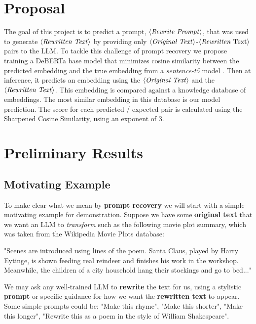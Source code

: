 \documentclass{article}
\theoremstyle{plain}
\theoremstyle{definition}
\theoremstyle{remark}
\begin{document}
\section{Proposal} %
The goal of this project is to predict a prompt, $\langle \text{\textit{Rewrite Prompt}} \rangle$, that was used to generate $\langle \text{\textit{Rewritten Text}} \rangle$ by providing only $\langle \text{\textit{Original Text}} \rangle$-$\langle \text{\textit{Rewritten} Text} \rangle$ pairs to the LLM. To tackle this challenge of prompt recovery we propose training a DeBERTa base model \cite{he2021deberta} that minimizes cosine similarity between the predicted embedding and the true embedding from a \textit{sentence-t5} model \cite{ni2021sentencet5}. Then at inference, it predicts an embedding using the $\langle \text{\textit{Original Text}} \rangle$ and the $\langle \text{\textit{Rewritten Text}} \rangle$. This embedding is compared against a knowledge database of embeddings. The most similar embedding in this database is our model prediction. The score for each predicted / expected pair is calculated using the Sharpened Cosine Similarity, using an exponent of 3.

\section{Preliminary Results} 

\subsection{Motivating Example}
To make clear what we mean by \textbf{prompt recovery} we will start with a simple motivating example for demonstration. Suppose we have some \textbf{original text} that we want an LLM to \textit{transform} such as the following movie plot summary, which was taken from the Wikipedia Movie Plots database:

\begin{displayquote}
"Scenes are introduced using lines of the poem. Santa Claus, played by Harry Eytinge, is shown feeding real reindeer and finishes his work in the workshop. Meanwhile, the children of a city household hang their stockings and go to bed..."
\end{displayquote}

We may ask any well-trained LLM to \textbf{rewrite} the text for us, using a stylistic \textbf{prompt} or specific guidance for how we want the \textbf{rewritten text} to appear. Some simple prompts could be: "Make this rhyme", "Make this shorter", "Make this longer", "Rewrite this as a poem in the style of William Shakespeare".
\end{document}
